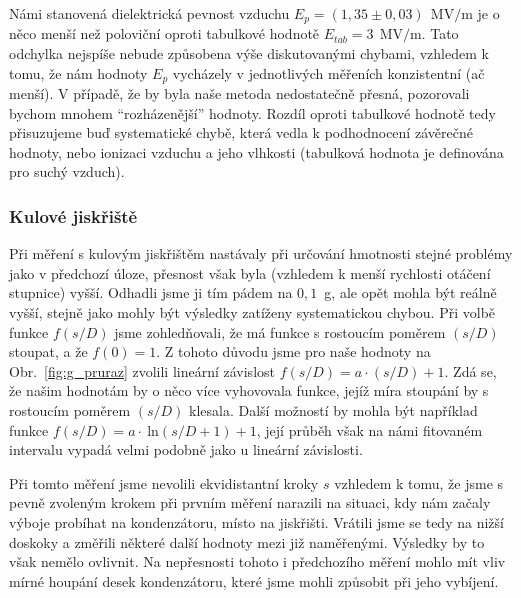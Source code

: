 \documentclass[english]{article}
\newcommand{\unit}[1]{\ \mathrm{#1}}
\begin{document}
					Námi stanovená dielektrická pevnost vzduchu $E_p = (1,35\pm 0,03)~\unit{MV/m}$ je o něco menší než poloviční oproti tabulkové \cite{bib:tabulky} hodnotě $E_{tab} = 3~\unit{MV/m}$. Tato odchylka nejspíše nebude způsobena výše diskutovanými chybami, vzhledem k tomu, že nám hodnoty $E_p$ vycházely v jednotlivých měřeních konzistentní (ač menší). V případě, že by byla naše metoda nedostatečně přesná, pozorovali bychom mnohem ``rozházenější'' hodnoty. Rozdíl oproti tabulkové hodnotě tedy přisuzujeme buď systematické chybě, která vedla k podhodnocení závěrečné hodnoty, nebo ionizaci vzduchu a jeho vlhkosti (tabulková hodnota je definována pro suchý vzduch).
			
			\subsubsection{Kulové jiskřiště}
		 			Při měření s kulovým jiskřištěm nastávaly při určování hmotnosti stejné problémy jako v předchozí úloze, přesnost však byla (vzhledem k menší rychlosti otáčení stupnice) vyšší. Odhadli jsme ji tím pádem na $0,1$~g, ale opět mohla být reálně vyšší, stejně jako mohly být výsledky zatíženy systematickou chybou. Při volbě funkce $f(s/D)$ jsme zohledňovali, že má funkce s rostoucím poměrem $(s/D)$ stoupat, a že $f(0)=1$. Z tohoto důvodu jsme pro naše hodnoty na Obr.~\ref{fig:g_pruraz} zvolili lineární závislost $f(s/D) = a\cdot(s/D) + 1$. Zdá se, že našim hodnotám by o něco více vyhovovala funkce, jejíž míra stoupání by s rostoucím poměrem $(s/D)$ klesala. Další možností by mohla být například funkce $f(s/D)=a\cdot\unit{ln}(s/D+1)+1$, její průběh však na námi fitovaném intervalu vypadá velmi podobně jako u lineární závislosti. 
		 			
		 			Při tomto měření jsme nevolili ekvidistantní kroky $s$ vzhledem k tomu, že jsme s pevně zvoleným krokem při prvním měření narazili na situaci, kdy nám začaly výboje probíhat na kondenzátoru, místo na jiskřišti. Vrátili jsme se tedy na nižší doskoky a změřili některé další hodnoty mezi již naměřenými. Výsledky by to však nemělo ovlivnit. Na nepřesnosti tohoto i předchozího měření mohlo mít vliv mírné houpání desek kondenzátoru, které jsme mohli způsobit při jeho vybíjení. 
	
\end{document}
